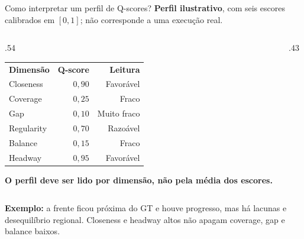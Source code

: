 \begin{frame}{Como interpretar um perfil de Q-scores?}
\textbf{Perfil ilustrativo}, com seis escores calibrados em $[0,1]$; não corresponde a uma execução real.
\begin{columns}[T,onlytextwidth]
\begin{column}{.54\textwidth}
\renewcommand{\arraystretch}{1.05}
\begin{tabular}{@{}lrr@{}}
\textbf{Dimensão} & \textbf{Q-score} & \textbf{Leitura} \\
Closeness & $0{,}90$ & Favorável \\
Coverage & $0{,}25$ & Fraco \\
Gap & $0{,}10$ & Muito fraco \\
Regularity & $0{,}70$ & Razoável \\
Balance & $0{,}15$ & Fraco \\
Headway & $0{,}95$ & Favorável \\
\end{tabular}
\par\smallskip
\textbf{O perfil deve ser lido por dimensão, não pela média dos escores.}
\end{column}
\begin{column}{.43\textwidth}\centering
{}
\end{column}
\end{columns}
\vspace{.03cm}\textbf{Exemplo:} a frente ficou próxima do GT e houve progresso, mas há lacunas e desequilíbrio regional. Closeness e headway altos não apagam coverage, gap e balance baixos.
\end{frame}

